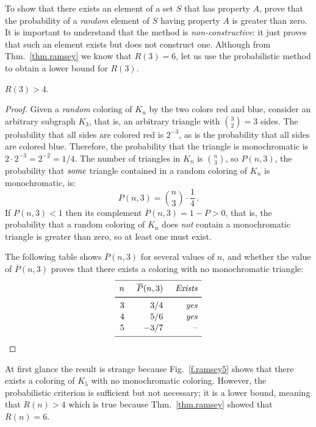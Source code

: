 To show that there exists an element of a set $S$ that has property $A$, prove that the probability of a \emph{random} element of $S$ having property $A$ is greater than zero. It is important to understand that the method is \emph{non-constructive}: it just proves that such an element exists but does not construct one. Although from Thm.~\ref{thm.ramsey} we know that $R(3)=6$, let us use the probabilistic method to obtain a lower bound for $R(3)$.

\begin{theorem}[Erd\H{o}s]
$R(3) > 4$.
\end{theorem}
\begin{proof}
Given a \emph{random} coloring of $K_n$ by the two colors red and blue, consider an arbitrary subgraph $K_3$, that is, an arbitrary triangle with $\binom{3}{2}=3$ sides. The probability that all sides are colored red is $2^{-3}$, as is the probability that all sides are colored blue. Therefore, the probability that the triangle is monochromatic is $2\cdot 2^{-3}=2^{-2}=1/4$. The number of triangles in $K_n$ is $\binom{n}{3}$, so $P(n,3)$, the probability that $\emph{some}$ triangle contained in a random coloring of $K_n$ is monochromatic, is:
\[
P(n,3)=\binom{n}{3}\cdot \frac{1}{4}\,.
\]
If $P(n,3)<1$ then its complement $\overline{P}(n,3)=1-P>0$, that is, the probability that a random coloring of $K_n$ does \emph{not} contain a monochromatic triangle is greater than zero, so at least one must exist.

The following table shows $\overline{P}(n,3)$ for several values of $n$, and whether the value of $\overline{P}(n,3)$ proves that there exists a coloring with no monochromatic triangle:
\[
\renewcommand*{\arraystretch}{1.1}
\begin{array}{r@{\hspace{5mm}}r@{\hspace{5mm}}r}
\hline
\noalign{\smallskip}
n & \overline{P}(n,3) & \textit{Exists}\\
\noalign{\smallskip}\svhline\noalign{\smallskip}
3 & 3/4 & \textit{yes} \\
4 & 5/6 & \textit{yes}\\
5 & -3/7 & \textrm{--}\\
\noalign{\smallskip}
 \hline
 \end{array}
\]
\end{proof}
At first glance the result is strange because Fig.~\ref{f.ramsey5} shows that there exists a coloring of $K_5$ with no monochromatic coloring. However, the probabilistic criterion is sufficient but not necessary; it is a lower bound, meaning that $R(n)>4$ which is true because Thm.~\ref{thm.ramsey} showed that $R(n)=6$.

